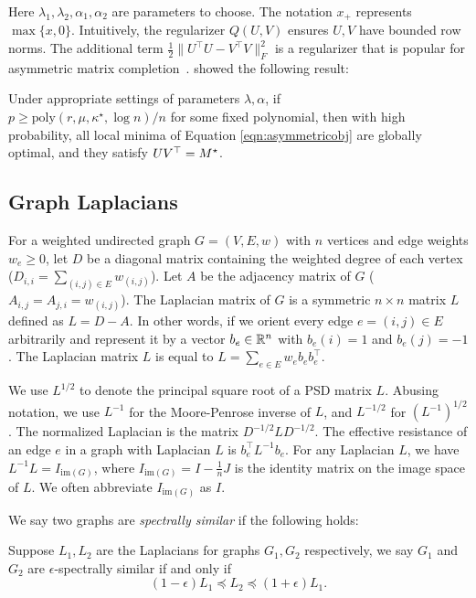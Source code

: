 Here $\lambda_1,\lambda_2,\alpha_1,\alpha_2$ are parameters to choose. The notation $x_+$ represents $\max\{x,0\}$. Intuitively, the regularizer $Q(U,V)$ ensures $U,V$ have bounded row norms. The additional term $\frac{1}{2}\|U^\top U-V^\top V\|_F^2$ is a regularizer that is popular for asymmetric matrix completion~\citep{park2016non}. \cite{GeJZ17} showed the following result:

\begin{theorem} Under appropriate settings of parameters $\lambda, \alpha$, if \\$p \ge \mbox{poly}(r,\mu,\kappa^\star,\log n)/n$ for some fixed polynomial, then with high probability, all local minima of Equation \eqref{eqn:asymmetricobj} are globally optimal, and they satisfy $UV^\top = M^\star$.
\end{theorem}

\subsection{Graph Laplacians}
\label{sec:laplacian}
For a weighted undirected graph $G = (V,E,w)$ with $n$ vertices and edge weights $w_e \ge 0$, let $D$ be a diagonal matrix containing the weighted degree of each vertex ($D_{i,i} = \sum_{(i,j)\in E} w_{(i,j)}$).
Let $A$ be the adjacency matrix of $G$ ($A_{i,j} = A_{j,i} = w_{(i,j)}$).
The Laplacian matrix of $G$ is a symmetric $n \times n$ matrix $L$ defined as $L = D - A$.
In other words, if we orient every edge $e = (i,j) \in E$ arbitrarily and represent it by a vector $b_e \in \mathbb{R}^n$ with $b_e(i) = 1$ and $b_e(j) = -1$.
The Laplacian matrix $L$ is equal to $L = \sum_{e\in E} w_e b_e b_e^\top$.

We use $L^{1/2}$ to denote the principal square root of a PSD matrix $L$.
Abusing notation, we use $L^{-1}$ for the Moore-Penrose inverse of $L$, and $L^{-1/2}$ for $(L^{-1})^{1/2}$.
The normalized Laplacian is the matrix $D^{-1/2} L D^{-1/2}$.
The effective resistance of an edge $e$ in a graph with Laplacian $L$ is $b_e^\top L^{-1} b_e$.
For any Laplacian $L$, we have $L^{-1} L = I_{\mathrm{im}(G)}$, where $I_{\mathrm{im}(G)} = I - \frac{1}{n} J$ is the identity matrix on the image space of $L$.
We often abbreviate $I_{\mathrm{im}(G)}$ as $I$.


We say two graphs are {\em spectrally similar} if the following holds: %

\begin{definition}
\label{def:spectral}
Suppose $L_1, L_2$ are the Laplacians for graphs $G_1, G_2$ respectively, we say $G_1$ and $G_2$ are $\epsilon$-spectrally similar if and only if
\[
(1-\epsilon) L_1 \preceq  L_2 \preceq (1+\epsilon)L_1.
\]
\end{definition}

